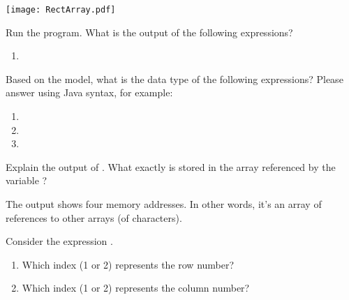 

\vspace{-20em}
\hfill \texttt{[image: RectArray.pdf]}
\vspace{3em}




\Q Run the program. What is the output of the following expressions?

\begin{enumerate}
\item {}
\hfill \ans[27em]{\jans{[[C@4dc63996, [C@d716361, [C@6ff3c5b5, [C@3764951d]}}
\end{enumerate}


\Q Based on the model, what is the data type of the following expressions? Please answer using Java syntax, for example: 

\begin{multicols}{3}
\begin{enumerate}
\item {}

\item {}

\item {}
\end{enumerate}
\end{multicols}


\Q \label{key1}
Explain the output of .
What exactly is stored in the array referenced by the variable ?

\begin{answer}[3em]
The output shows four memory addresses.
In other words, it's an array of references to other arrays (of characters).
\end{answer}


\Q Consider the expression .

\begin{enumerate}
\item Which index (1 or 2) represents the row number?    
\item Which index (1 or 2) represents the column number? 
\end{enumerate}


